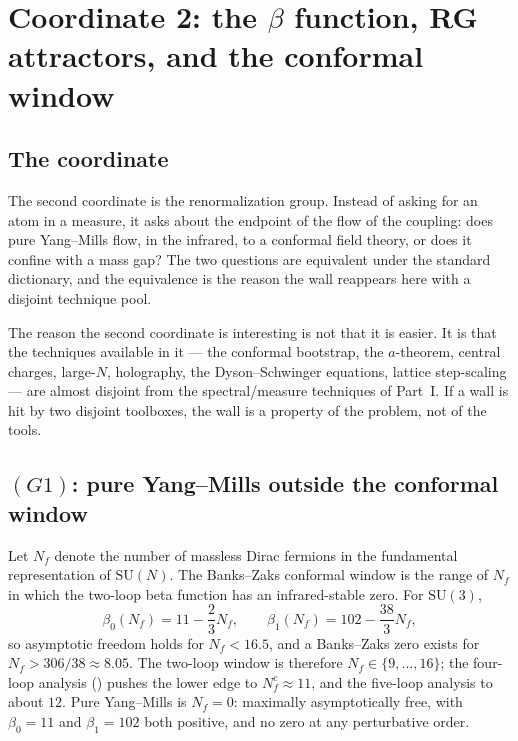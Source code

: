 \section{Coordinate 2: the $\beta$ function, RG attractors, and the conformal window}
\label{ch:betarg}

\subsection{The coordinate}

The second coordinate is the renormalization group. Instead of asking for an atom in a measure,
it asks about the endpoint of the flow of the coupling: does pure Yang--Mills flow, in the
infrared, to a conformal field theory, or does it confine with a mass gap? The two questions are
equivalent under the standard dictionary, and the equivalence is the reason the wall reappears
here with a disjoint technique pool.

The reason the second coordinate is interesting is not that it is easier. It is that the
techniques available in it --- the conformal bootstrap, the $a$-theorem, central charges,
large-$N$, holography, the Dyson--Schwinger equations, lattice step-scaling --- are almost
disjoint from the spectral/measure techniques of Part~I. If a wall is hit by two disjoint
toolboxes, the wall is a property of the problem, not of the tools.

\subsection{$(G1)$: pure Yang--Mills outside the conformal window}

Let $N_f$ denote the number of massless Dirac fermions in the fundamental representation of
$\mathrm{SU}(N)$. The Banks--Zaks conformal window is the range of $N_f$ in which the
two-loop beta function has an infrared-stable zero. For $\mathrm{SU}(3)$,
\begin{equation}
\beta_0(N_f)=11-\frac23N_f,\qquad
\beta_1(N_f)=102-\frac{38}{3}N_f ,
\label{eq:beta01}
\end{equation}
so asymptotic freedom holds for $N_f<16.5$, and a Banks--Zaks zero exists for
$N_f>306/38\approx8.05$. The two-loop window is therefore $N_f\in\{9,\dots,16\}$; the four-loop
analysis () pushes the lower edge to $N_f^c\approx11$, and
the five-loop analysis to about $12$. Pure Yang--Mills is $N_f=0$: maximally asymptotically free,
with $\beta_0=11$ and $\beta_1=102$ both positive, and no zero at any perturbative order.

